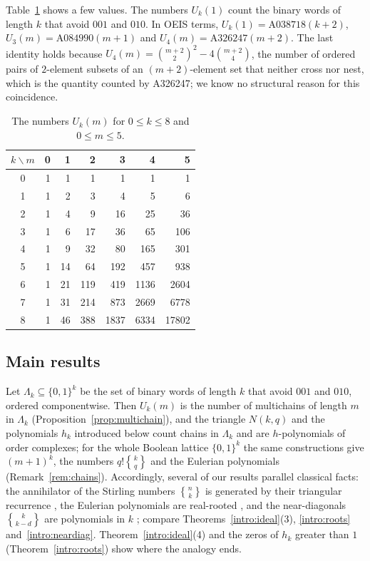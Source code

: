\documentclass[11pt]{amsart}
\theoremstyle{definition}
\newcommand{\stirling}[2]{\genfrac{\{}{\}}{0pt}{}{#1}{#2}}
\begin{document}
Table~\ref{tab:U} shows a few values. The numbers $U_k(1)$ count the binary words of length $k$ that avoid $001$ and $010$. In OEIS terms, $U_k(1)=\text{A038718}(k+2)$, $U_3(m)=\text{A084990}(m+1)$ and $U_4(m)=\text{A326247}(m+2)$. The last identity holds because $U_4(m)=\binom{m+2}{2}^2-4\binom{m+2}{4}$, the number of ordered pairs of $2$-element subsets of an $(m+2)$-element set that neither cross nor nest, which is the quantity counted by A326247; we know no structural reason for this coincidence.

\begin{table}[ht]
\centering
\begin{tabular}{c|rrrrrr}
\toprule
$k\backslash m$ & 0 & 1 & 2 & 3 & 4 & 5\\
\midrule
0 & 1 & 1 & 1 & 1 & 1 & 1\\
1 & 1 & 2 & 3 & 4 & 5 & 6\\
2 & 1 & 4 & 9 & 16 & 25 & 36\\
3 & 1 & 6 & 17 & 36 & 65 & 106\\
4 & 1 & 9 & 32 & 80 & 165 & 301\\
5 & 1 & 14 & 64 & 192 & 457 & 938\\
6 & 1 & 21 & 119 & 419 & 1136 & 2604\\
7 & 1 & 31 & 214 & 873 & 2669 & 6778\\
8 & 1 & 46 & 388 & 1837 & 6334 & 17802\\
\bottomrule
\end{tabular}
\caption{The numbers $U_k(m)$ for $0\le k\le 8$ and $0\le m\le 5$.}\label{tab:U}
\end{table}

\subsection{Main results}
Let $\Lambda_k\subseteq\{0,1\}^k$ be the set of binary words of length $k$ that avoid $001$ and $010$, ordered componentwise. Then $U_k(m)$ is the number of multichains of length $m$ in $\Lambda_k$ (Proposition~\ref{prop:multichain}), and the triangle $N(k,q)$ and the polynomials $h_k$ introduced below count chains in $\Lambda_k$ and are $h$-polynomials of order complexes; for the whole Boolean lattice $\{0,1\}^k$ the same constructions give $(m+1)^k$, the numbers $q!\stirling{k}{q}$ and the Eulerian polynomials (Remark~\ref{rem:chains}). Accordingly, several of our results parallel classical facts: the annihilator of the Stirling numbers $\stirling{n}{k}$ is generated by their triangular recurrence \cite[Example~5]{Kauers07}, the Eulerian polynomials are real-rooted \cite{Branden}, and the near-diagonals $\stirling{k}{k-d}$ are polynomials in $k$ \cite{GesselStanley}; compare Theorems~\ref{intro:ideal}(3), \ref{intro:roots} and~\ref{intro:neardiag}. Theorem~\ref{intro:ideal}(4) and the zeros of $h_k$ greater than $1$ (Theorem~\ref{intro:roots}) show where the analogy ends.
\end{document}
